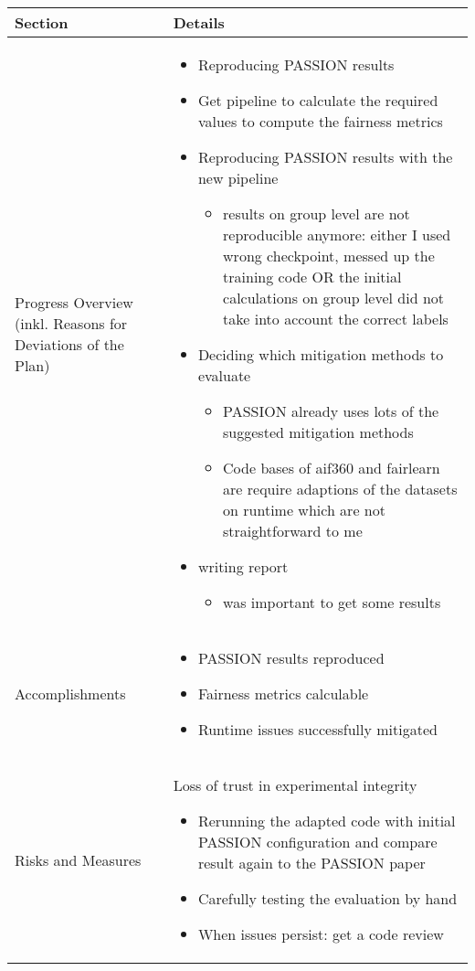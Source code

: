 \documentclass[a4paper,11pt]{article}
\newcommand{\done}{\textcolor{green}{\ding{52}}}
\newcommand{\ongoing}{\textcolor{orange}{\ding{45}}}
\newcommand{\notstarted}{\textcolor{red}{\ding{56}}}
\begin{document}
	
	\renewcommand{\arraystretch}{1.5}
	\begin{longtable}{|p{3.5cm}|>{\vspace{-\baselineskip}}p{12cm}|}
		\hline
		\textbf{Section} & \textbf{Details} \\
		\hline
		Progress Overview (inkl. Reasons for Deviations of the Plan) & \begin{itemize}[topsep=6pt]
			\item[\done] Reproducing PASSION results
			\item[\done] Get pipeline to calculate the required values to compute the fairness metrics
			\item[\ongoing] Reproducing PASSION results with the new pipeline
			\begin{itemize}
				\item results on group level are not reproducible anymore: either I used wrong checkpoint, messed up the training code OR the initial calculations on group level did not take into account the correct labels
			\end{itemize}
			\item[\ongoing] Deciding which mitigation methods to evaluate
			\begin{itemize}
				\item PASSION already uses lots of the suggested mitigation methods
				\item Code bases of aif360 and fairlearn are require adaptions of the datasets on runtime which are not straightforward to me
			\end{itemize}
			\item[\notstarted] writing report
			\begin{itemize}
				\item was important to get some results
			\end{itemize}
		\end{itemize} \\
		\hline
		Accomplishments & \begin{itemize}[topsep=6pt]
			\item[\done] PASSION results reproduced
			\item[\done] Fairness metrics calculable
			\item[\done] Runtime issues successfully mitigated
		\end{itemize} \\
		\hline
		Risks and Measures &
		
		Loss of trust in experimental integrity
		\begin{itemize}
			\item Rerunning the adapted code with initial PASSION configuration and compare result again to the PASSION paper
			\item Carefully testing the evaluation by hand
			\item When issues persist: get a code review 
		\end{itemize}
		 

\end{longtable}
\end{document}
